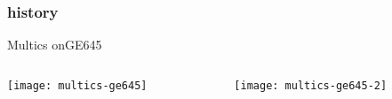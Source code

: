 \begin{frame}[plain,t]
	\frametitle{history}
			\centering
	\LARGE Multics onGE645
	\begin{columns}
	
	\begin{column}{.5\textwidth}

		\texttt{[image: multics-ge645]}
		
		
		
	\end{column}
	
	\begin{column}{.5\textwidth}
		

		
	\texttt{[image: multics-ge645-2]}		
	\end{column}
	
	
\end{columns}
	
\end{frame}
